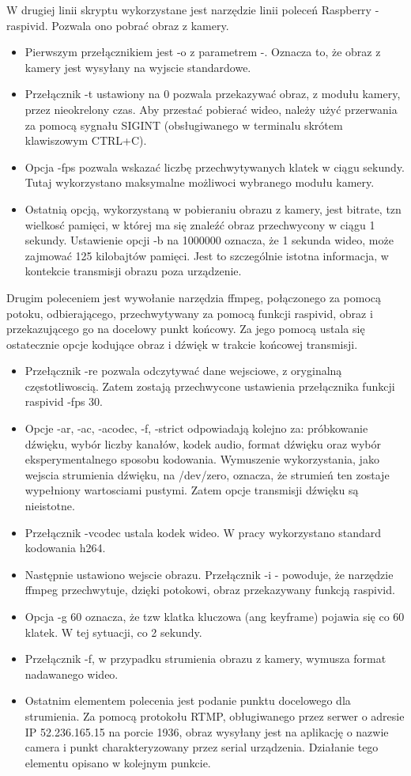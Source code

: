 W drugiej linii skryptu wykorzystane jest narzędzie linii poleceń Raspberry - raspivid. Pozwala ono pobrać obraz z kamery. 
\begin{itemize}
\item Pierwszym przełącznikiem jest -o z parametrem -. Oznacza to, że obraz z kamery jest wysyłany na wyjscie standardowe.
\item Przełącznik -t ustawiony na 0 pozwala przekazywać obraz, z modułu kamery, przez nieokrelony czas. Aby przestać pobierać wideo, należy użyć przerwania za pomocą sygnału SIGINT (obsługiwanego w terminalu skrótem klawiszowym CTRL+C).
\item Opcja -fps pozwala wskazać liczbę przechwytywanych klatek w ciągu sekundy. Tutaj wykorzystano maksymalne możliwoci wybranego modułu kamery.
\item Ostatnią opcją, wykorzystaną w pobieraniu obrazu z kamery, jest bitrate, tzn wielkosć pamięci, w której ma się znaleźć obraz przechwycony w ciągu 1 sekundy. Ustawienie opcji -b na 1000000 oznacza, że 1 sekunda wideo, może zajmować 125 kilobajtów pamięci. Jest to szczególnie istotna informacja, w kontekcie transmisji obrazu poza urządzenie.
\end{itemize}

Drugim poleceniem jest wywołanie narzędzia ffmpeg, połączonego za pomocą potoku, odbierającego, przechwytywany za pomocą funkcji raspivid, obraz i przekazującego go na docelowy punkt końcowy. Za jego pomocą ustala się ostatecznie opcje kodujące obraz i dźwięk w trakcie końcowej transmisji.
\begin{itemize}
\item Przełącznik -re pozwala odczytywać dane wejsciowe, z oryginalną częstotliwoscią. Zatem zostają przechwycone ustawienia przełącznika funkcji raspivid -fps 30.
\item Opcje  -ar, -ac, -acodec, -f, -strict odpowiadają kolejno za: próbkowanie dźwięku, wybór liczby kanałów, kodek audio, format dźwięku oraz wybór eksperymentalnego sposobu kodowania. Wymuszenie wykorzystania, jako wejscia strumienia dźwięku, na /dev/zero, oznacza, że strumień ten zostaje wypełniony wartosciami pustymi. Zatem opcje transmisji dźwięku są nieistotne.
\item Przełącznik -vcodec ustala kodek wideo. W pracy wykorzystano standard kodowania h264.
\item Następnie ustawiono wejscie obrazu. Przełącznik -i - powoduje, że narzędzie ffmpeg przechwytuje, dzięki potokowi, obraz przekazywany funkcją raspivid.
\item Opcja -g 60 oznacza, że tzw klatka kluczowa (ang keyframe) pojawia się co 60 klatek. W tej sytuacji, co 2 sekundy. 
\item Przełącznik -f, w przypadku strumienia obrazu z kamery, wymusza format nadawanego wideo.  
\item Ostatnim elementem polecenia jest podanie punktu docelowego dla strumienia. Za pomocą protokołu RTMP, obługiwanego przez serwer o adresie IP 52.236.165.15 na porcie 1936, obraz wysyłany jest na aplikację o nazwie camera i punkt charakteryzowany przez serial urządzenia. Działanie tego elementu opisano w kolejnym punkcie. 
\end{itemize}

